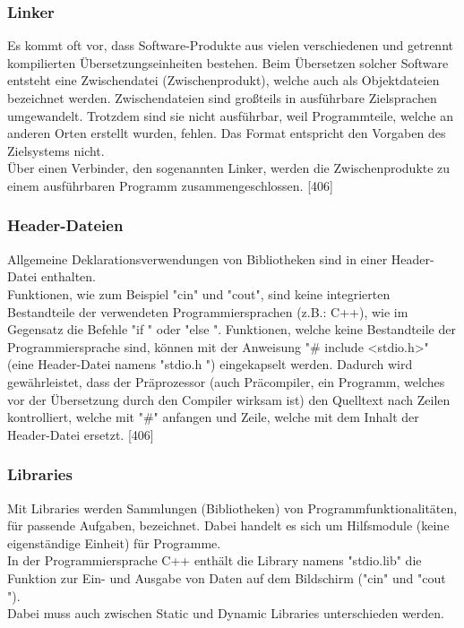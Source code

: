 \documentclass[12pt,a4paper]{report}
\begin{document}
\begin{onehalfspace}
\subsubsection{Linker}
Es kommt oft vor, dass Software-Produkte aus vielen verschiedenen und getrennt kompilierten Übersetzungseinheiten bestehen. Beim Übersetzen solcher Software entsteht eine Zwischendatei (Zwischenprodukt), welche auch als Objektdateien bezeichnet werden. Zwischendateien sind großteils in ausführbare Zielsprachen umgewandelt. Trotzdem sind sie nicht ausführbar, weil Programmteile, welche an anderen Orten erstellt wurden, fehlen. Das Format entspricht den Vorgaben des Zielsystems nicht.
\\Über einen Verbinder, den sogenannten Linker, werden die Zwischenprodukte zu einem ausführbaren Programm zusammengeschlossen. [406]

\subsubsection{Header-Dateien}
Allgemeine Deklarationsverwendungen von Bibliotheken sind in einer Header-Datei enthalten.
\\Funktionen, wie zum Beispiel "{}cin"{} und "{}cout{}", sind keine integrierten Bestandteile der verwendeten Programmiersprachen (z.B.: C++), wie im Gegensatz die Befehle "{}if "{} oder "{}else "{}. Funktionen, welche keine Bestandteile der Programmiersprache sind, können mit der Anweisung "{}\# include \textless stdio.h\textgreater "{} (eine Header-Datei namens "{}stdio.h "{}) eingekapselt werden. Dadurch wird gewährleistet, dass der Präprozessor (auch Präcompiler, ein Programm, welches vor der Übersetzung durch den Compiler wirksam ist) den Quelltext nach Zeilen kontrolliert, welche mit "{}\#"{} anfangen und Zeile, welche mit dem Inhalt der Header-Datei ersetzt. [406]

\subsubsection{Libraries}
Mit Libraries werden Sammlungen (Bibliotheken) von Programmfunktionalitäten, für passende Aufgaben, bezeichnet. Dabei handelt es sich um Hilfsmodule (keine eigenständige Einheit) für Programme.\\
In der Programmiersprache C++ enthält die Library namens "{}stdio.lib"{} die Funktion zur Ein- und Ausgabe von Daten auf dem Bildschirm ("{}cin"{} und "{}cout "{}).\\
Dabei muss auch zwischen Static und Dynamic Libraries unterschieden werden.


\end{onehalfspace}
\end{document}
